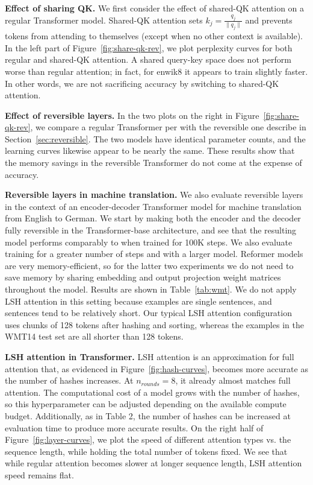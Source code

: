 \textbf{Effect of sharing QK.} \label{sec:exp_qk}
We first consider the effect of shared-QK attention on a regular Transformer model. Shared-QK attention sets $k_j = \frac{q_j}{\|q_j\|}$ and prevents tokens from attending to themselves (except when no other context is available). In the left part of Figure~\ref{fig:share-qk-rev}, we plot perplexity curves for both regular and shared-QK attention. A shared query-key space does not perform worse than regular attention; in fact, for enwik8 it appears to train slightly faster. In other words, we are not sacrificing accuracy by switching to shared-QK attention. 


\textbf{Effect of reversible layers.} \label{sec:exp_rev}
In the two plots on the right in Figure~\ref{fig:share-qk-rev}, we compare a regular Transformer per \citet{transformer} with the reversible one describe in Section~\ref{sec:reversible}. The two models have identical parameter counts, and the learning curves likewise appear to be nearly the same. These results show that the memory savings in the reversible Transformer do not come at the expense of accuracy.

\textbf{Reversible layers in machine translation.} We also evaluate reversible layers in the context of an encoder-decoder Transformer model for machine translation from English to German. We start by making both the encoder and the decoder fully reversible in the Transformer-base architecture, and see that the resulting model performs comparably to \citet{transformer} when trained for 100K steps. We also evaluate training for a greater number of steps and with a larger model. Reformer models are very memory-efficient, so for the latter two experiments we do not need to save memory by sharing embedding and output projection weight matrices throughout the model. Results are shown in Table~\ref{tab:wmt}. We do not apply LSH attention in this setting because examples are single sentences, and sentences tend to be relatively short. Our typical LSH attention configuration uses chunks of 128 tokens after hashing and sorting, whereas the examples in the WMT14 test set are all shorter than 128 tokens.

\textbf{LSH attention in Transformer.} \label{sec:exp_lsh}
LSH attention is an approximation for full attention that, as evidenced in Figure~\ref{fig:hash-curves}, becomes more accurate as the number of hashes increases. At $n_{rounds}=8$, it already almost matches full attention. The computational cost of a model grows with the number of hashes, so this hyperparameter can be adjusted depending on the available compute budget. Additionally, as in Table 2, the number of hashes can be increased at evaluation time to produce more accurate results. On the right half of Figure~\ref{fig:layer-curves}, we plot the speed of different attention types vs. the sequence length, while holding the total number of tokens fixed. We see that while regular attention becomes slower at longer sequence length, LSH attention speed remains flat.

